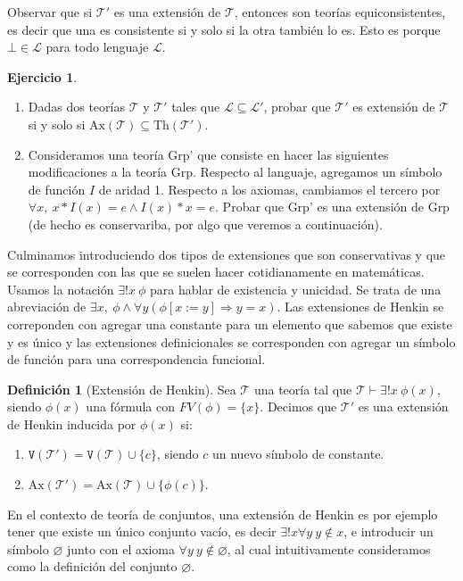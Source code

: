 \documentclass[a4paper, 12pt]{report}
\newcommand{\Ra}{\Rightarrow}
\newcommand{\te}{\text}
\theoremstyle{definition}
\newtheorem{definicion}[teorema]{Definición}
\newtheorem{ejercicio}{Ejercicio}[section]
\begin{document}
Observar que si $\mathcal{T}'$ es una extensión de $\mathcal{T}$, entonces son teorías equiconsistentes, es decir que una es consistente si y solo si la otra también lo es. Esto es porque $\bot\in\mathcal{L}$ para todo lenguaje $\mathcal{L}$. 

\begin{ejercicio}\label{ejer-Extensiones}
	\begin{enumerate}
		\item Dadas dos teorías $\mathcal{T}$ y $\mathcal{T}'$ tales que $\mathcal{L}\subseteq\mathcal{L}'$, probar que $\mathcal{T}'$ es extensión de $\mathcal{T}$ si y solo si $\te{Ax}(\mathcal{T})\subseteq\te{Th}(\mathcal{T}')$.
		\item Consideramos una teoría Grp' que consiste en hacer las siguientes modificaciones a la teoría Grp. Respecto al languaje, agregamos un símbolo de función $I$ de aridad 1. Respecto a los axiomas, cambiamos el tercero por $\forall x,~x*I(x)=e\wedge I(x)*x=e$. Probar que Grp' es una extensión de Grp (de hecho es conservariba, por algo que veremos a continuación).
	\end{enumerate}
\end{ejercicio}

Culminamos introduciendo dos tipos de extensiones que son conservativas y que se corresponden con las que se suelen hacer cotidianamente en matemáticas. Usamos la notación $\exists!x~\phi$ para hablar de existencia y unicidad. Se trata de una abreviación de $\exists x,~\phi\wedge\forall y(\phi[x:=y]\Ra y=x)$. Las extensiones de Henkin se correponden con agregar una constante para un elemento que sabemos que existe y es único y las extensiones definicionales se corresponden con agregar un símbolo de función para una correspondencia funcional.
\begin{definicion}[Extensión de Henkin]
	Sea $\mathcal{T}$ una teoría tal que $\mathcal{T}\vdash\exists!x~\phi(x)$, siendo $\phi(x)$ una fórmula con $FV(\phi)=\{x\}$. Decimos que $\mathcal{T}'$ es una extensión de Henkin inducida por $\phi(x)$ si:
	\begin{enumerate}
		\item $\mathtt{V}(\mathcal{T}')=\mathtt{V}(\mathcal{T})\cup\{c\}$, siendo $c$ un nuevo símbolo de constante.
		\item $\te{Ax}(\mathcal{T}')=\te{Ax}(\mathcal{T})\cup\{\phi(c)\}$.
	\end{enumerate}
\end{definicion}
En el contexto de teoría de conjuntos, una extensión de Henkin es por ejemplo tener que existe un único conjunto vacío, es decir $\exists!x\forall y~y\not\in x$, e introducir un símbolo $\varnothing$ junto con el axioma $\forall y~y\not\in\varnothing$, al cual intuitivamente consideramos como la definición del conjunto $\varnothing$.
\end{document}
